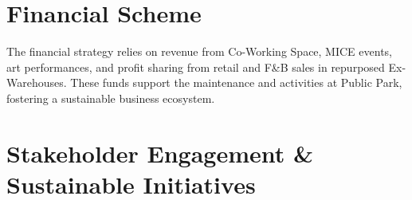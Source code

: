 \section*{
  Financial Scheme
 }

The financial strategy relies on revenue from Co-Working Space, MICE events, art performances, and profit sharing from retail and F\&B sales in repurposed Ex-Warehouses. These funds support the maintenance and activities at Public Park, fostering a sustainable business ecosystem.
\section*{
  Stakeholder Engagement \& Sustainable Initiatives
 }

\vfill

\EndTwoColumnLayout
\newpage
